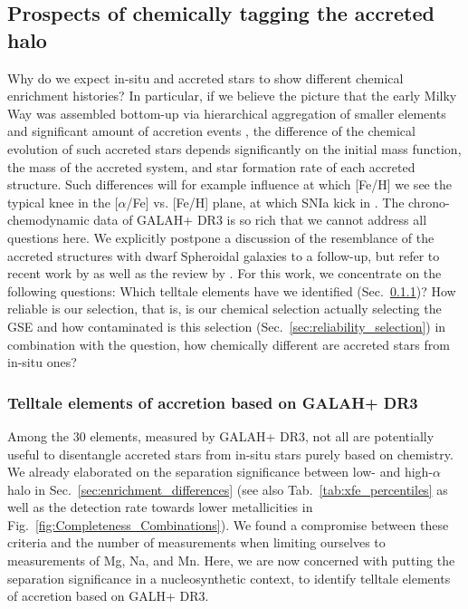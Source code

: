 \documentclass[fleqn,usenatbib]{mnras}
\begin{document}
\subsection{Prospects of chemically tagging the accreted halo} \label{sec:prospects_chem_tagg}

Why do we expect in-situ and accreted stars to show different chemical enrichment histories? In particular, if we believe the picture that the early Milky Way was assembled bottom-up via hierarchical aggregation of smaller elements and significant amount of accretion events \citep[e.g.][]{Searle1978}, the difference of the chemical evolution of such accreted stars depends significantly on the initial mass function, the mass of the accreted system, and star formation rate of each accreted structure. Such differences will for example influence at which [Fe/H] we see the typical knee in the [$\alpha$/Fe] vs. [Fe/H] plane, at which SNIa kick in \citep[e.g.][]{McWilliam1997, Matteucci2021}. The chrono-chemodynamic data of GALAH+ DR3 is so rich that we cannot address all questions here. We explicitly postpone a discussion of the resemblance of the accreted structures with dwarf Spheroidal galaxies to a follow-up, but refer to recent work by \citet{Hayes2018} as well as the review by \citet{Nissen2018}. For this work, we concentrate on the following questions: Which telltale elements have we identified (Sec.~\ref{sec:tell_tale})? How reliable is our selection, that is, is our chemical selection actually selecting the GSE and how contaminated is this selection (Sec.~\ref{sec:reliability_selection}) in combination with the question, how chemically different are accreted stars from in-situ ones?

\subsubsection{Telltale elements of accretion based on GALAH+ DR3} \label{sec:tell_tale}

Among the 30 elements, measured by GALAH+ DR3, not all are potentially useful to disentangle accreted stars from in-situ stars purely based on chemistry. We already elaborated on the separation significance between low- and high-$\alpha$ halo in Sec.~\ref{sec:enrichment_differences} (see also Tab.~\ref{tab:xfe_percentiles} as well as the detection rate towards lower metallicities in Fig.~\ref{fig:Completeness_Combinations}). We found a compromise between these criteria and the number of measurements when limiting ourselves to measurements of Mg, Na, and Mn. Here, we are now concerned with putting the separation significance in a nucleosynthetic context, to identify telltale elements of accretion based on GALH+ DR3.
\end{document}
